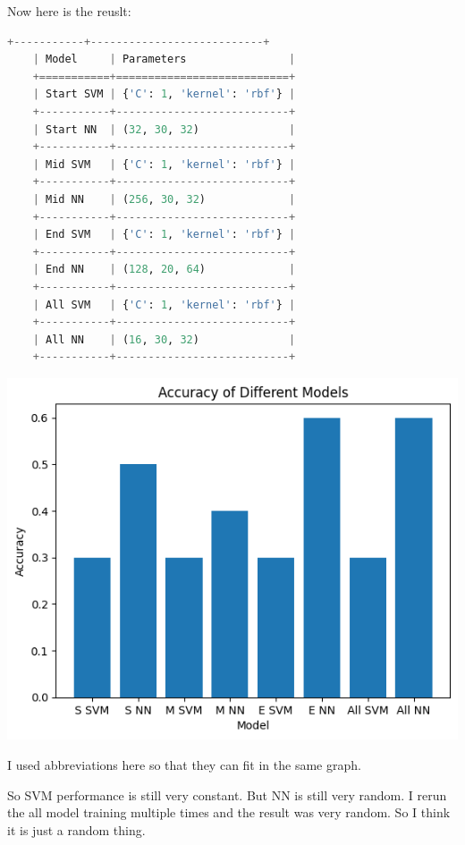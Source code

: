 \documentclass[letterpaper,12pt]{article}
\begin{document}
Now here is the reuslt:\begin{lstlisting}[language=Python]
    +-----------+---------------------------+
    | Model     | Parameters                |
    +===========+===========================+
    | Start SVM | {'C': 1, 'kernel': 'rbf'} |
    +-----------+---------------------------+
    | Start NN  | (32, 30, 32)              |
    +-----------+---------------------------+
    | Mid SVM   | {'C': 1, 'kernel': 'rbf'} |
    +-----------+---------------------------+
    | Mid NN    | (256, 30, 32)             |
    +-----------+---------------------------+
    | End SVM   | {'C': 1, 'kernel': 'rbf'} |
    +-----------+---------------------------+
    | End NN    | (128, 20, 64)             |
    +-----------+---------------------------+
    | All SVM   | {'C': 1, 'kernel': 'rbf'} |
    +-----------+---------------------------+
    | All NN    | (16, 30, 32)              |
    +-----------+---------------------------+
\end{lstlisting}
\includegraphics*[scale=0.8]{All data.png}

I used abbreviations here so that they can fit in the same graph.

So SVM performance is still very constant. But NN is still very random. I rerun the all model training multiple times and the result was very random. So I think it is just a random thing.
\end{document}
